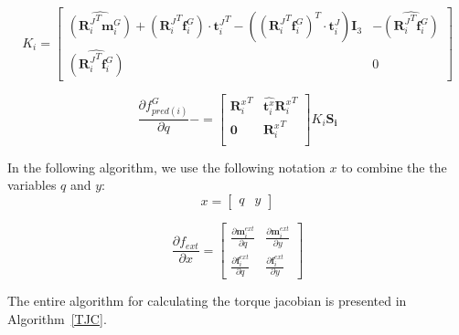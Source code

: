 \begin{equation}
  K_i =
  \begin{bmatrix}
    \widehat{({\mathbf{R}_i^J}^T \mathbf{m}^{G}_i)}
    + \left({\mathbf{R}_i^J}^T \mathbf{f}^{G}_i\right) \cdot {\mathbf{t}^J_i}^T
    - \left( {({\mathbf{R}_i^J}^T \mathbf{f}^{G}_i)}^T \cdot \mathbf{t}^J_i\right) \mathbf{I}_3
    & -\widehat{({\mathbf{R}_i^J}^T \mathbf{f}^{G}_i)} \\
    \widehat{({\mathbf{R}_i^J}^T \mathbf{f}^{G}_i)} & 0
  \end{bmatrix}
\end{equation}

\begin{equation}
  \frac{\partial f^G_{pred(i)}}{\partial q} -=
  \begin{bmatrix}
    {\mathbf{R}^{x}_i}^T & \widehat{\mathbf{t}^{x}_i}{\mathbf{R}^{x}_i}^T \\
    \mathbf{0} & {\mathbf{R}^{x}_i}^T \\
  \end{bmatrix}
  K_i \mathbf{S_i}
\end{equation}

In the following algorithm, we use the following notation $x$ to combine the the variables $q$ and $y$:
\begin{equation}
  x = \begin{bmatrix}
    q & y
  \end{bmatrix}
\end{equation}

\begin{equation}
  \frac{\partial f_{ext}}{\partial x} =
  \begin{bmatrix}
    \frac{\partial \mathbf{m}^{ext}_i}{\partial q} & \frac{\partial \mathbf{m}^{ext}_i}{\partial y}
    \\
    \frac{\partial \mathbf{f}^{ext}_i}{\partial q} & \frac{\partial \mathbf{f}^{ext}_i}{\partial y}
  \end{bmatrix}
\end{equation}


The entire algorithm for calculating the torque jacobian is presented in Algorithm~\ref{TJC}.

